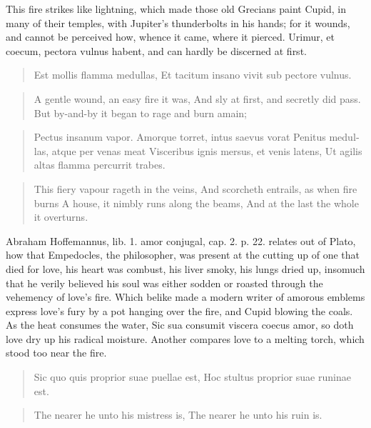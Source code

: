This fire strikes like lightning, which made those old Grecians paint
Cupid, in many of their temples, with Jupiter's thunderbolts in
his hands; for it wounds, and cannot be perceived how, whence it came,
where it pierced. Urimur, et coecum, pectora vulnus habent, and
can hardly be discerned at first.

\begin{latin}
\begin{verse}
Est mollis flamma medullas,
Et tacitum insano vivit sub pectore vulnus.
\end{verse}
\end{latin}
\translationrule%
\begin{verse}%
A gentle wound, an easy fire it was,
And sly at first, and secretly did pass.
But by-and-by it began to rage and burn amain;
\end{verse}%

\begin{latin}
\begin{verse}
Pectus insanum vapor.
Amorque torret, intus saevus vorat
Penitus medullas, atque per venas meat
Visceribus ignis mersus, et venis latens,
Ut agilis altas flamma percurrit trabes.
\end{verse}
\end{latin}
\translationrule%
\begin{verse}%
This fiery vapour rageth in the veins,
And scorcheth entrails, as when fire burns
A house, it nimbly runs along the beams,
And at the last the whole it overturns.
\end{verse}%

Abraham Hoffemannus, lib. 1. amor conjugal, cap. 2. p. 22. relates out
of Plato, how that Empedocles, the philosopher, was present at the
cutting up of one that died for love, his heart was combust, his
liver smoky, his lungs dried up, insomuch that he verily believed his
soul was either sodden or roasted through the vehemency of love's fire.
Which belike made a modern writer of amorous emblems express love's
fury by a pot hanging over the fire, and Cupid blowing the coals. As
the heat consumes the water, Sic sua consumit viscera coecus
amor, so doth love dry up his radical moisture. Another compares love
to a melting torch, which stood too near the fire.

\begin{latin}
\begin{verse}
Sic quo quis proprior suae puellae est,
Hoc stultus proprior suae runinae est.
\end{verse}
\end{latin}
\translationrule%
\begin{verse}%
The nearer he unto his mistress is,
The nearer he unto his ruin is.
\end{verse}%

